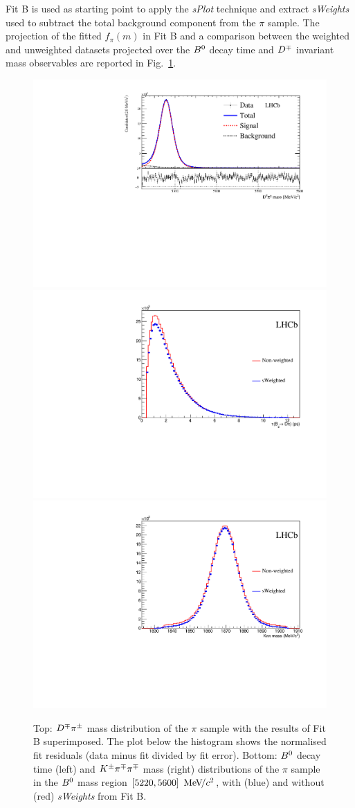 Fit B is used as starting point to apply the \emph{sPlot} technique and extract
\emph{sWeights} used to subtract the total background component from the $\pi$
sample. The projection of the fitted $f_{\pi}(m)$ in Fit B and a comparison
between the weighted and unweighted datasets projected over the $B^0$ decay time
and $D^\mp$ invariant mass observables are reported in Fig.~\ref{fig:sWeightComp}.
\begin{figure}[t]
	\begin{center}
		\includegraphics[width=0.65\linewidth]{03Massfit/figs/MDFitPlots_Bd/MDFitForSWeights_BeautyMass_Bd2DPi.pdf} \\
		\includegraphics[width=0.45\linewidth]{03Massfit/figs/MDFitPlots_Bd/sWeightedDistribution_BeautyTime.pdf}
		\includegraphics[width=0.45\linewidth]{03Massfit/figs/MDFitPlots_Bd/sWeightedDistribution_CharmMass.pdf}
	\end{center}
        \vspace{-2mm}
	\caption{Top: $D^\mp\pi^\pm$ mass distribution of the $\pi$ sample with the results of Fit B superimposed. 
	The plot below the histogram shows the normalised fit residuals (data minus fit divided by fit error). Bottom: $B^0$ decay time (left) and $K^\pm\pi^\mp\pi^\mp$ mass (right) distributions of the $\pi$
	sample in the $B^0$ mass region $[5220,5600]~{\mathrm{\,Me\kern -0.1em V\!/}c^2}$, with (blue) and without (red) \emph{sWeights} from Fit B.}
	\label{fig:sWeightComp}
\end{figure}

